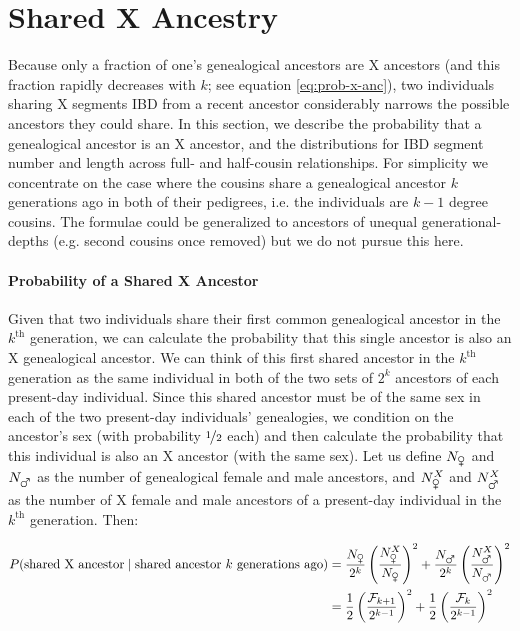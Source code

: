 \documentclass[11pt]{article}
\begin{document}
\section{Shared X Ancestry}
\label{sec:shared-x-anc}

Because only a fraction of one's genealogical ancestors are X ancestors (and
this fraction rapidly decreases with $k$; see equation \eqref{eq:prob-x-anc}),
two individuals sharing X segments IBD from a recent ancestor considerably
narrows the possible ancestors they could share. In this section, we describe
the probability that a genealogical ancestor is an X ancestor, and the
distributions for IBD segment number and length across full- and half-cousin
relationships. For simplicity we concentrate on the case where the cousins
share a genealogical ancestor $k$ generations ago in both of their pedigrees,
i.e. the individuals are $k-1$ degree cousins. The formulae could be
generalized to ancestors of unequal generational-depths (e.g. second cousins
once removed) but we do not pursue this here.

\paragraph{Probability of a Shared X Ancestor} 

Given that two individuals share their first common genealogical ancestor in
the $k^\text{th}$ generation, we can calculate the probability that this
single ancestor is also an X genealogical ancestor. We can think of this first
shared ancestor in the $k^\text{th}$ generation as the same individual in both
of the two sets of $2^k$ ancestors of each present-day individual. Since this
shared ancestor must be of the same sex in each of the two present-day
individuals' genealogies, we condition on the ancestor's sex (with probability
$\nicefrac{1}{2}$ each) and then calculate the probability that this individual
is also an X ancestor (with the same sex). Let us define $N_{\venus}$ and
$N_{\mars}$ as the number of genealogical female and male ancestors, and
$N_{\venus}^X$ and $N_{\mars}^X$ as the number of X female and male ancestors
of a present-day individual in the $k^\text{th}$ generation. Then:

\begin{align}
  \label{eq:prob-shared-x-ancestor}
  P(\text{shared X ancestor} \; | \; \text{shared ancestor } k \text{ generations ago}) &= \frac{N_{\venus}}{2^k}\left(\frac{N_{\venus}^X}{N_{\venus}}\right)^2 + 
  \frac{N_{\mars}}{2^k}\left(\frac{N_{\mars}^X}{N_{\mars}}\right)^2 \nonumber \\
  &= \frac{1}{2}\left(\frac{\mathcal{F}_{k+1}}{2^{k-1}}\right)^2 + \frac{1}{2}\left(\frac{\mathcal{F}_k}{2^{k-1}}\right)^2
\end{align}
\end{document}
